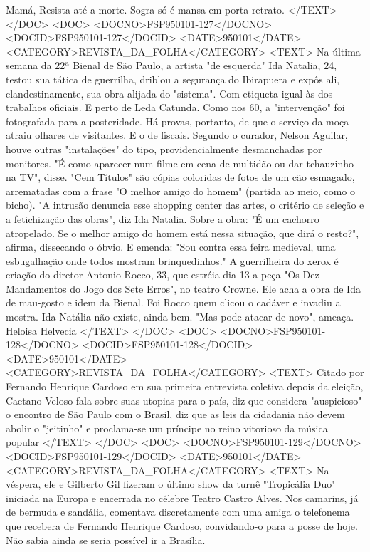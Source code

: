 Mamá,
Resista até a morte. Sogra só é mansa em porta-retrato.
</TEXT>
</DOC>
<DOC>
<DOCNO>FSP950101-127</DOCNO>
<DOCID>FSP950101-127</DOCID>
<DATE>950101</DATE>
<CATEGORY>REVISTA_DA_FOLHA</CATEGORY>
<TEXT>
Na última semana da 22ª Bienal de São Paulo, a artista "de esquerda" Ida Natalia, 24, testou sua tática de guerrilha, driblou a segurança do Ibirapuera e expôs ali, clandestinamente, sua obra alijada do "sistema". Com etiqueta igual às dos trabalhos oficiais. E perto de Leda Catunda.
Como nos 60, a "intervenção" foi fotografada para a posteridade. Há provas, portanto, de que o serviço da moça atraiu olhares de visitantes. E o de fiscais. Segundo o curador, Nelson Aguilar, houve outras "instalações" do tipo, providencialmente desmanchadas por monitores. "É como aparecer num filme em cena de multidão ou dar tchauzinho na TV", disse.
"Cem Títulos" são cópias coloridas de fotos de um cão esmagado, arrematadas com a frase "O melhor amigo do homem" (partida ao meio, como o bicho). "A intrusão denuncia esse shopping center das artes, o critério de seleção e a fetichização das obras", diz Ida Natalia.
Sobre a obra: "É um cachorro atropelado. Se o melhor amigo do homem está nessa situação, que dirá o resto?", afirma, dissecando o óbvio. E emenda: "Sou contra essa feira medieval, uma esbugalhação onde todos mostram brinquedinhos." 
A guerrilheira do xerox é criação do diretor Antonio Rocco, 33, que estréia dia 13 a peça "Os Dez Mandamentos do Jogo dos Sete Erros", no teatro Crowne. Ele acha a obra de Ida de mau-gosto e idem da Bienal. Foi Rocco quem clicou o cadáver e invadiu a mostra. Ida Natália não existe, ainda bem. "Mas pode atacar de novo", ameaça.
Heloisa Helvecia
</TEXT>
</DOC>
<DOC>
<DOCNO>FSP950101-128</DOCNO>
<DOCID>FSP950101-128</DOCID>
<DATE>950101</DATE>
<CATEGORY>REVISTA_DA_FOLHA</CATEGORY>
<TEXT>
Citado por Fernando Henrique Cardoso em sua primeira entrevista coletiva depois da eleição, Caetano Veloso fala sobre suas utopias para o país, diz que considera "auspicioso" o encontro de São Paulo com o Brasil, diz que as leis da cidadania não devem abolir o "jeitinho" e proclama-se um príncipe no reino vitorioso da música popular
</TEXT>
</DOC>
<DOC>
<DOCNO>FSP950101-129</DOCNO>
<DOCID>FSP950101-129</DOCID>
<DATE>950101</DATE>
<CATEGORY>REVISTA_DA_FOLHA</CATEGORY>
<TEXT>
Na véspera, ele e Gilberto Gil fizeram o último show da turnê "Tropicália Duo" iniciada na Europa e encerrada no célebre Teatro Castro Alves. Nos camarins, já de bermuda e sandália, comentava discretamente com uma amiga o telefonema que recebera de Fernando Henrique Cardoso, convidando-o para a posse de hoje. Não sabia ainda se seria possível ir a Brasília.
